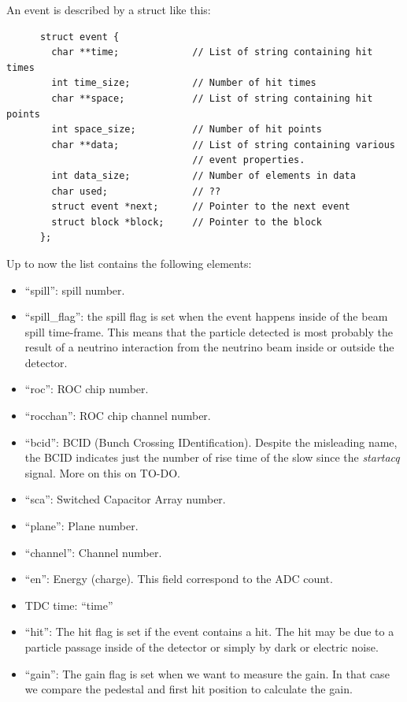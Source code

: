 An event is described by a struct like this:
\begin{lstlisting}
      struct event {
        char **time;             // List of string containing hit times
        int time_size;           // Number of hit times
        char **space;            // List of string containing hit points
        int space_size;          // Number of hit points
        char **data;             // List of string containing various
                                 // event properties.
        int data_size;           // Number of elements in data
        char used;               // ??
        struct event *next;      // Pointer to the next event
        struct block *block;     // Pointer to the block
      };
\end{lstlisting}
Up to now the  list contains the following elements:
\begin{itemize}
\item ``spill'': spill number.
\item ``spill\_flag'': the spill flag is set when the event happens
  inside of the beam spill time-frame. This means that the particle
  detected is most probably the result of a neutrino interaction from
  the neutrino beam inside or outside the detector.
\item ``roc'': ROC chip number.
\item ``rocchan'': ROC chip channel number.
\item ``bcid'': BCID (Bunch Crossing IDentification). Despite the
  misleading name, the BCID indicates just the number of rise time of
  the slow since the \textit{startacq} signal. More on this on TO-DO.\@
\item ``sca'': Switched Capacitor Array number.
\item ``plane'': Plane number.
\item ``channel'': Channel number.
\item ``en'': Energy (charge). This field correspond to the ADC count.
\item TDC time: ``time''
\item ``hit'': The hit flag is set if the event contains a hit. The
  hit may be due to a particle passage inside of the detector or
  simply by dark or electric noise.
\item ``gain'': The gain flag is set when we want to measure the
  gain. In that case we compare the pedestal and first hit position to
  calculate the gain.
\end{itemize}

